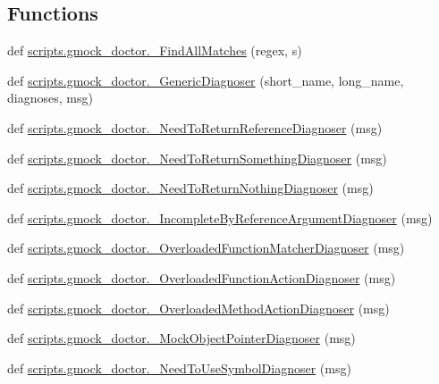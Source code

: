 \subsection*{Functions}
\begin{DoxyCompactItemize}
\item 
def \mbox{\hyperlink{namespacescripts_1_1gmock__doctor_a0c2de0f6719fa2f238d319a8a0a21db4}{scripts.\+gmock\+\_\+doctor.\+\_\+\+Find\+All\+Matches}} (regex, s)
\item 
def \mbox{\hyperlink{namespacescripts_1_1gmock__doctor_a54b9fcec8897c51a3b59d511bcf9776c}{scripts.\+gmock\+\_\+doctor.\+\_\+\+Generic\+Diagnoser}} (short\+\_\+name, long\+\_\+name, diagnoses, msg)
\item 
def \mbox{\hyperlink{namespacescripts_1_1gmock__doctor_aab9ccefd6d382282e8157050fa78263f}{scripts.\+gmock\+\_\+doctor.\+\_\+\+Need\+To\+Return\+Reference\+Diagnoser}} (msg)
\item 
def \mbox{\hyperlink{namespacescripts_1_1gmock__doctor_a137c363aa051ead573700a3224a42a64}{scripts.\+gmock\+\_\+doctor.\+\_\+\+Need\+To\+Return\+Something\+Diagnoser}} (msg)
\item 
def \mbox{\hyperlink{namespacescripts_1_1gmock__doctor_a552e21b6fc3015296d7e696f3a8db0da}{scripts.\+gmock\+\_\+doctor.\+\_\+\+Need\+To\+Return\+Nothing\+Diagnoser}} (msg)
\item 
def \mbox{\hyperlink{namespacescripts_1_1gmock__doctor_a2c19af7093263cceceb841c51caff9dd}{scripts.\+gmock\+\_\+doctor.\+\_\+\+Incomplete\+By\+Reference\+Argument\+Diagnoser}} (msg)
\item 
def \mbox{\hyperlink{namespacescripts_1_1gmock__doctor_a19cab9d6e40b95aac3aa28304b313839}{scripts.\+gmock\+\_\+doctor.\+\_\+\+Overloaded\+Function\+Matcher\+Diagnoser}} (msg)
\item 
def \mbox{\hyperlink{namespacescripts_1_1gmock__doctor_aad7e3ce8270d754a0dc380ff4e6dcefe}{scripts.\+gmock\+\_\+doctor.\+\_\+\+Overloaded\+Function\+Action\+Diagnoser}} (msg)
\item 
def \mbox{\hyperlink{namespacescripts_1_1gmock__doctor_a3cb82cb73c54433d6b5e5f9380546eac}{scripts.\+gmock\+\_\+doctor.\+\_\+\+Overloaded\+Method\+Action\+Diagnoser}} (msg)
\item 
def \mbox{\hyperlink{namespacescripts_1_1gmock__doctor_aadd56fe5bdde0bbd24d43518b3ae4d86}{scripts.\+gmock\+\_\+doctor.\+\_\+\+Mock\+Object\+Pointer\+Diagnoser}} (msg)
\item 
def \mbox{\hyperlink{namespacescripts_1_1gmock__doctor_a6c5502e6b1cf3d5f8ca7943c4c82d086}{scripts.\+gmock\+\_\+doctor.\+\_\+\+Need\+To\+Use\+Symbol\+Diagnoser}} (msg)

\end{DoxyCompactItemize}
